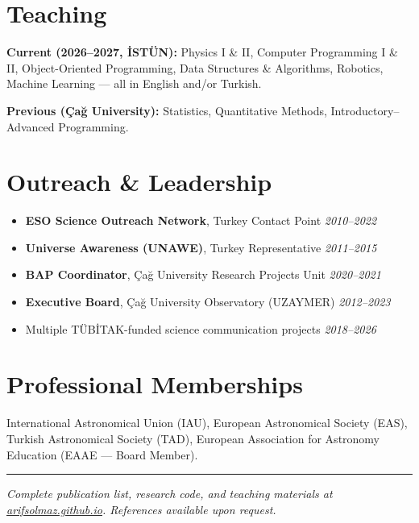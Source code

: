 \documentclass[11pt,a4paper]{article}
\begin{document}
\section{Teaching}

\textbf{Current (2026--2027, İSTÜN):} Physics I \& II, Computer Programming I \& II, Object-Oriented Programming, Data Structures \& Algorithms, Robotics, Machine Learning --- all in English and/or Turkish.

\vspace{2pt}
\textbf{Previous (Çağ University):} Statistics, Quantitative Methods, Introductory--Advanced Programming.

\section{Outreach \& Leadership}
\begin{itemize}
    \item \textbf{ESO Science Outreach Network}, Turkey Contact Point \hfill \textit{2010--2022}
    \item \textbf{Universe Awareness (UNAWE)}, Turkey Representative \hfill \textit{2011--2015}
    \item \textbf{BAP Coordinator}, Çağ University Research Projects Unit \hfill \textit{2020--2021}
    \item \textbf{Executive Board}, Çağ University Observatory (UZAYMER) \hfill \textit{2012--2023}
    \item Multiple TÜBİTAK-funded science communication projects \hfill \textit{2018--2026}
\end{itemize}

\section{Professional Memberships}
International Astronomical Union (IAU), European Astronomical Society (EAS), Turkish Astronomical Society (TAD), European Association for Astronomy Education (EAAE --- Board Member).

\vspace{0.6em}
\begin{center}
\hrule
\vspace{0.4em}
\small\textit{Complete publication list, research code, and teaching materials at \href{https://arifsolmaz.github.io}{arifsolmaz.github.io}.
References available upon request.}
\end{center}
\end{document}
